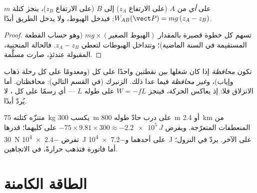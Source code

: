 \begin{proposition}\label{prop:g12:work-and-energy:weight}
على \emph{أي}  من $A$ (على الارتفاع $z_A$) إلى $B$ (على الارتفاع
$z_B$)، ينجز  كتلة $m$ 
$W_{AB}(\vect P) = mg\,(z_A - z_B)$: فيدخل الهبوط، ولا يدخل الطريق أبدًا.
\end{proposition}

\begin{proof}
تسهم كل خطوة قصيرة بالمقدار $mg \times (\text{الهبوط الصغير})$ (وهو حساب
القطعة المستقيمة في السنة الماضية)؛ وتتداخل الهبوطات لتعطي
$z_A - z_B$. فالحالة المنحنية، المقبولة عندئذٍ، صارت مسلَّمة.
\end{proof}

\begin{definition}\label{def:g12:work-and-energy:conservative}
تكون  \emph{محافظة} إذا كان شغلها
بين نقطتين واحدًا على كل  (ومعدومًا على كل رحلة ذهاب
وإياب)، و\emph{غير محافظة}
فيما عدا ذلك.   الزنبرك (في القسم التالي): محافظتان.
أما  الانزلاق فلا: إذ يعاكس الحركة، فينجز $W = -fL$ على
 طوله $L$ --- أي رسمًا على كل ، لا يُردّ أبدًا.
\end{definition}

\begin{example}\label{ex:g12:work-and-energy:trails}
متنزّه كتلته \qty{75}{kg} يكسب \qty{300}{m} على درب حادّ طوله \qty{800}{m}
أو \qty{2.4}{km} من المنعطفات المتعرّجة. ويفرض 
$-75 \times 9.81 \times 300 \approx \qty{-2.2e5}{J}$ على كليهما؛  
قدرها \qty{30}{N} تفرض \qty{-2.4e4}{J} على أحدهما و\qty{-7.2e4}{J}
على الآخر.  يردّ في النزول؛ أما فاتورة  فتذهب
حرارةً، في الاتجاهين.
\end{example}

\section{الطاقة الكامنة}

